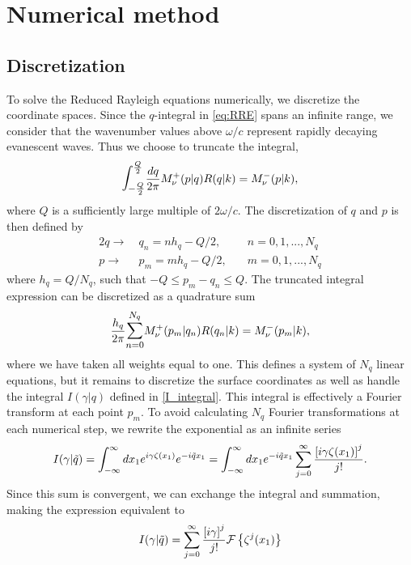 \documentclass[../main.tex]{subfiles}
\begin{document}
\section{Numerical method}


\subsection{Discretization}
To solve the Reduced Rayleigh equations numerically, we discretize the coordinate spaces. Since the $q$-integral in \autoref{eq:RRE} spans an infinite range, we consider that the wavenumber values above $\omega/c$ represent rapidly decaying evanescent waves. Thus we choose to truncate the integral,
\begin{equation}
    \mathlarger{\mathlarger{\int}}^{\frac{Q}{2}}_{-\frac{Q}{2}} \frac{dq}{2\pi} M_\nu^+(p|q)R(q|k) = M_\nu^-(p|k),
\end{equation}
where $Q$ is a sufficiently large multiple of $2\omega/c$. The discretization of $q$ and $p$ is then defined by 
\begin{alignat*}{2}
    q \longrightarrow&\ q_n = nh_q - Q/2,\quad &n = 0,1,...,N_q\\
    p \longrightarrow&\ p_m = mh_q - Q/2,\quad &m = 0,1,...,N_q
\end{alignat*}
where $h_q = Q/N_q$, such that $-Q \leq p_m - q_n \leq Q$. The truncated integral expression can be discretized as a quadrature sum
\begin{equation} \label{eq:discrete_RRE}
    \frac{h_q}{2\pi} \mathlarger{\sum^{N_q}_{n=0}} M_\nu^+(p_m|q_n)R(q_n|k) = M_\nu^-(p_m|k),
\end{equation}
where we have taken all weights equal to one. This defines a system of $N_q$ linear equations, but it remains to discretize the surface coordinates as well as handle the integral $I(\gamma|q)$ defined in \autoref{I_integral}. This integral is effectively a Fourier transform at each point $p_m$. To avoid calculating $N_q$ Fourier transformations at each numerical step, we rewrite the exponential as an infinite series
\begin{equation*}
    I(\gamma|\Tilde{q}) = \int_{-\infty}^{\infty}dx_1 e^{i\gamma\zeta(x_1)} e^{-i\Tilde{q}x_1} = \int_{-\infty}^{\infty}dx_1 e^{-i\Tilde{q}x_1}\sum_{j=0}^{\infty} \frac{ \left[i\gamma\zeta(x_1) \right]^j}{ j! }.
\end{equation*}
Since this sum is convergent, we can exchange the integral and summation, making the expression equivalent to
\begin{equation}\label{eq:I_expanded}
    I(\gamma | \Tilde{q}) = \sum_{j=0}^\infty \frac{ \left[i\gamma\right]^j}{j!}\mathcal{F}\left\{\zeta^j(x_1)\right\}
\end{equation}
\end{document}
